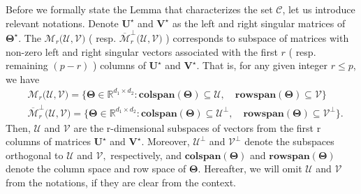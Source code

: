 \documentclass[alpha-refs]{wiley-article}
\begin{document}
Before we formally state the Lemma that characterizes the set $\mathcal{C}$, let us introduce relevant notations.
Denote $\boldsymbol{U}^{\star}$ and $\boldsymbol{V}^{\star}$ as the left and right singular matrices of $\boldsymbol{\Theta}^{\star}$.
The $\mathcal{M}_{r}\big( \mathcal{U}, \mathcal{V} \big)$ ( resp. $\overline{\mathcal{M}}_{r}^{\perp}\big( \mathcal{U}, \mathcal{V} \big)$ ) corresponds to subspace of matrices with non-zero left and right singular vectors associated with the first $r$ ( resp.  remaining $(p-r)$ ) columns of $\boldsymbol{U}^{\star}$ and $\boldsymbol{V}^{\star}$.
That is, for any given integer $r\leq p$, we have
\begin{align*}
    &\mathcal{M}_{r}\big( \mathcal{U}, \mathcal{V} \big) = \big\{ \boldsymbol{\Theta}\in\mathbb{R}^{d_{1} \times d_{2}} : \textbf{colspan}(\boldsymbol{\Theta}) \subseteq \mathcal{U},\quad  \textbf{rowspan}(\boldsymbol{\Theta}) \subseteq \mathcal{V}  \big\} \\
    &\overline{\mathcal{M}}_{r}^{\perp}\big( \mathcal{U}, \mathcal{V} \big) = \big\{ \boldsymbol{\Theta}\in\mathbb{R}^{d_{1} \times d_{2}} : \textbf{colspan}(\boldsymbol{\Theta}) \subseteq \mathcal{U}^{\perp},\quad  \textbf{rowspan}(\boldsymbol{\Theta}) \subseteq \mathcal{V}^{\perp} \big\}.
\end{align*}
Then, $\mathcal{U}$ and $\mathcal{V}$ are the r-dimensional subspaces of vectors from the first r columns of matrices $\boldsymbol{U}^{\star}$ and $\boldsymbol{V}^{\star}$.
Moreover, $\mathcal{U}^{\perp}$ and $\mathcal{V}^{\perp}$ denote the subspaces orthogonal to  $\mathcal{U}$ and $\mathcal{V},$ respectively, and $\textbf{colspan}(\boldsymbol{\Theta})$ and $\textbf{rowspan}(\boldsymbol{\Theta})$ denote the column space and row space of $\boldsymbol{\Theta}$.
Hereafter, we will omit $\mathcal{U}$ and $\mathcal{V}$ from the notations, if they are clear from the context.
\end{document}
